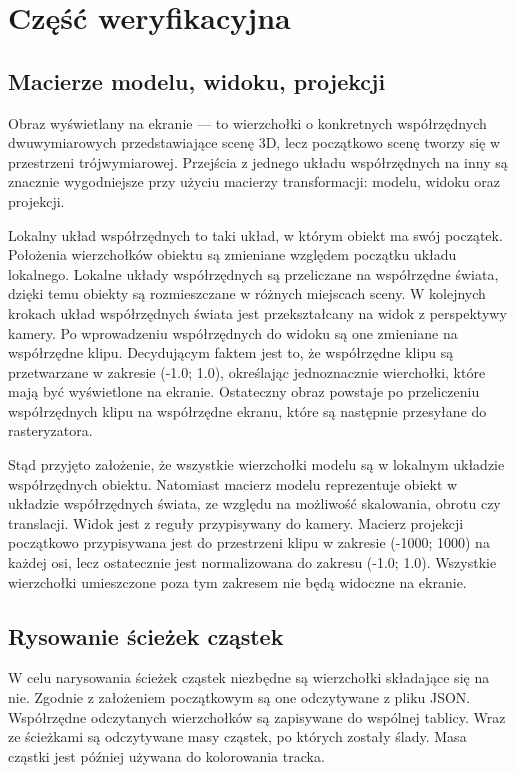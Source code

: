 \newpage
\section{Część weryfikacyjna}
\subsection{Macierze modelu, widoku, projekcji}
Obraz wyświetlany na ekranie --- to wierzchołki o konkretnych współrzędnych dwuwymiarowych przedstawiające scenę 3D, lecz początkowo scenę tworzy się w przestrzeni trójwymiarowej. Przejścia z jednego układu współrzędnych na inny są znacznie wygodniejsze przy użyciu macierzy transformacji: modelu, widoku oraz projekcji. 

Lokalny układ współrzędnych to taki układ, w którym obiekt ma swój początek. Położenia wierzchołków obiektu są zmieniane względem początku układu lokalnego. Lokalne układy współrzędnych są przeliczane na współrzędne świata, dzięki temu obiekty są rozmieszczane w różnych miejscach sceny. W kolejnych krokach układ współrzędnych świata jest przekształcany na widok z perspektywy kamery. Po wprowadzeniu współrzędnych do widoku są one zmieniane na współrzędne klipu. Decydującym faktem jest to, że współrzędne klipu są przetwarzane w zakresie (-1.0; 1.0), określając jednoznacznie wierchołki, które mają być wyświetlone na ekranie. Ostateczny obraz powstaje po przeliczeniu współrzędnych klipu na współrzędne ekranu, które są następnie przesyłane do rasteryzatora. 

Stąd przyjęto założenie, że wszystkie wierzchołki modelu są w lokalnym układzie współrzędnych obiektu. Natomiast macierz modelu reprezentuje  obiekt w układzie współrzędnych świata, ze względu na możliwość skalowania, obrotu czy translacji. Widok jest z reguły przypisywany do kamery. Macierz projekcji początkowo przypisywana jest do przestrzeni klipu w zakresie (-1000; 1000) na każdej osi, lecz ostatecznie jest normalizowana do zakresu (-1.0; 1.0). Wszystkie wierzchołki umieszczone poza tym zakresem nie będą widoczne na ekranie.

\subsection{Rysowanie ścieżek cząstek}
W celu narysowania ścieżek cząstek niezbędne są wierzchołki składające się na nie. Zgodnie z założeniem początkowym są one odczytywane z pliku JSON. Współrzędne odczytanych wierzchołków są zapisywane do wspólnej tablicy. Wraz ze ścieżkami są odczytywane masy cząstek, po których zostały ślady. Masa cząstki jest później używana do kolorowania tracka.


